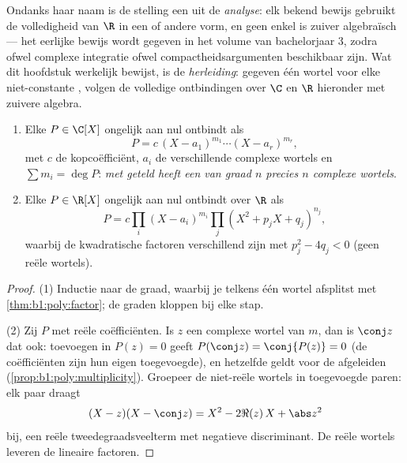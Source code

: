 \begin{remark}
Ondanks haar naam is de stelling een  uit de \emph{analyse}:
elk bekend bewijs gebruikt de volledigheid van $\R$ in een of andere
vorm, en geen enkel is zuiver algebraïsch --- het eerlijke bewijs wordt
gegeven in het volume van bachelorjaar 3, zodra ofwel complexe integratie
ofwel compactheidsargumenten beschikbaar zijn. Wat dit hoofdstuk
werkelijk bewijst, is de \emph{herleiding}: gegeven één wortel voor elke
niet-constante , volgen de volledige ontbindingen over $\C$ en $\R$
hieronder met zuivere algebra.
\end{remark}

\begin{corollary}\label{cor:b1:poly:factorization}
\begin{enumerate}
  \item Elke $P \in \C[X]$ ongelijk aan nul ontbindt als
        \[
        P = c\, (X - a_1)^{m_1} \cdots (X - a_r)^{m_r},
        \]
        met $c$ de kopcoëfficiënt, $a_i$ de verschillende complexe
        wortels en $\sum m_i = \deg P$: \emph{met  geteld
        heeft een  van graad $n$ precies $n$ complexe wortels}.
  \item Elke $P \in \R[X]$ ongelijk aan nul ontbindt over $\R$ als
        \[
        P = c \prod_i (X - a_i)^{m_i} \prod_j (X^2 + p_j X +
        q_j)^{n_j},
        \]
        waarbij de kwadratische factoren verschillend zijn met $p_j^2 -
        4q_j < 0$ (geen reële wortels).
\end{enumerate}
\end{corollary}

\begin{proof}
(1) Inductie naar de graad, waarbij je telkens één wortel afsplitst met
\cref{thm:b1:poly:factor}; de graden kloppen bij elke stap.

(2) Zij $P$ met reële coëfficiënten. Is $z$ een complexe wortel van
 $m$, dan is $\conj z$ dat ook: toevoegen in $P(z) = 0$
geeft $P(\conj z) = \conj{P(z)} = 0$ (de coëfficiënten zijn hun eigen
toegevoegde), en hetzelfde geldt voor de afgeleiden
(\cref{prop:b1:poly:multiplicity}). Groepeer de niet-reële wortels in
toegevoegde paren: elk paar draagt
\[
(X - z)(X - \conj z) = X^2 - 2\Re(z)\, X + \abs z^2
\]
bij, een reële tweedegraadsveelterm met negatieve discriminant. De reële
wortels leveren de lineaire factoren.
\end{proof}

